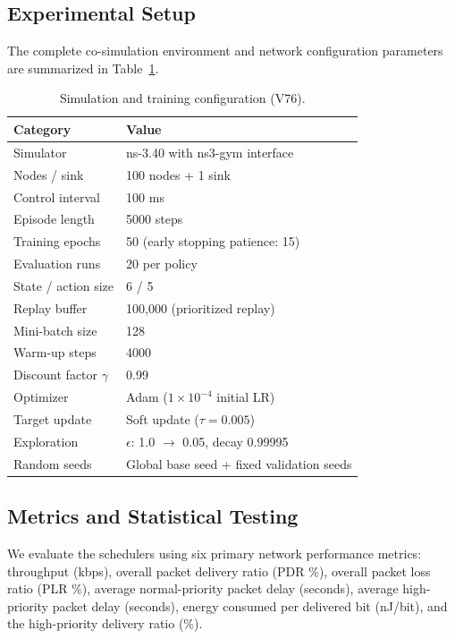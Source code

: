 \documentclass[runningheads,a4paper]{llncs}
\begin{document}
\subsection{Experimental Setup}
The complete co-simulation environment and network configuration parameters are summarized in Table~\ref{tab:setup}.

\begin{table}[t]
\centering
\caption{Simulation and training configuration (V76).}
\label{tab:setup}
\scriptsize
\setlength{\tabcolsep}{4pt}
\begin{tabular}{ll}
\toprule
Category & Value \\
\midrule
Simulator & ns-3.40 with ns3-gym interface \\
Nodes / sink & 100 nodes + 1 sink \\
Control interval & 100 ms \\
Episode length & 5000 steps \\
Training epochs & 50 (early stopping patience: 15) \\
Evaluation runs & 20 per policy \\
State / action size & 6 / 5 \\
Replay buffer & 100,000 (prioritized replay) \\
Mini-batch size & 128 \\
Warm-up steps & 4000 \\
Discount factor $\gamma$ & 0.99 \\
Optimizer & Adam ($1\times10^{-4}$ initial LR) \\
Target update & Soft update ($\tau=0.005$) \\
Exploration & $\epsilon$: 1.0 $\rightarrow$ 0.05, decay 0.99995 \\
Random seeds & Global base seed + fixed validation seeds \\
\bottomrule
\end{tabular}
\end{table}

\subsection{Metrics and Statistical Testing}
We evaluate the schedulers using six primary network performance metrics: throughput (kbps), overall packet delivery ratio (PDR \%), overall packet loss ratio (PLR \%), average normal-priority packet delay (seconds), average high-priority packet delay (seconds), energy consumed per delivered bit (nJ/bit), and the high-priority delivery ratio (\%).
\end{document}
